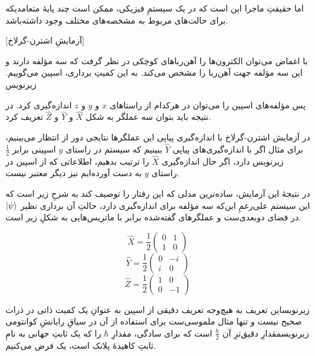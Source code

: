 \documentclass[a4paper,12pt]{article}
\begin{document}
اما حقیقتِ ماجرا این است که در یک سیستمِ فیزیکی، ممکن است چند پایهٔ متعامدیکه برای  حالت‌های مربوط به مشخصه‌های مختلف وجود داشته‌باشد.

[آزمایشِ اشترن-گرلاخ]


با اغماض می‌توان الکترون‌ها را آهن‌رباهای کوچکی در نظر گرفت که سه مؤلفه دارند و این سه مؤلفه جهت آهن‌ربا را مشخص می‌کند. به این کمیتِ برداری، اسپین می‌گوییم.
‌زیرنویس

پس مؤلفه‌های اسپین را می‌توان در هرکدام از راستاهای \(x\) و \(y\) و \(z\) اندازه‌گیری کرد. در نتیجه باید بتوان سه عملگر به شکل 
\(\hat{X}\)
و 
\(\hat{Y}\)
و 
\(\hat{Z}\)
تعریف کرد.

در آزمایش اشترن-گرلاخ با اندازه‌گیری پیاپی این عملگرها نتایجی دور از انتظار می‌بینیم، برای مثال اگر با اندازه‌گیری‌های پیاپی 
\(\hat{Y}\)
ببینیم که سیستم در راستای \(y\) اسپینی برابر 
\(\frac{1}{2}\)
‌زیرنویس
دارد، اگر حال اندازه‌گیری 
\(\hat{X}\)
را ترتیب بدهیم، اطلاعاتی که از اسپین در راستای \(y\) به دست آورده‌ایم نیز دیگر معتبر نیست.

در نتیجهٔ این آزمایش، ساده‌ترین مدلی که این رفتار را توصیف کند به شرحِ زیر است که این سیستم علی‌رغمِ این‌که سه مؤلفه برای اندازه‌گیری دارد، حالتِ آن برداری نظیر 
\(\ket{\psi}\)
در فضای دوبعدی‌ست و عملگرهای گفته‌شده برابر با ماتریس‌هایی به شکلِ زیر است.

\begin{equation} \hat{X} = \frac{1}{2} \begin{pmatrix} 0 & 1 \\ 1 & 0 \end{pmatrix} \end{equation}
\begin{equation} \hat{Y} = \frac{1}{2} \begin{pmatrix} 0 & -i \\ i & 0 \end{pmatrix} \end{equation}
\begin{equation} \hat{Z} = \frac{1}{2} \begin{pmatrix} 1 & 0 \\ 0 & -1 \end{pmatrix} \end{equation}

‌زیرنویس{این تعریف به هیچ‌وجه تعریف دقیقی از اسپین به عنوانِ یک کمیت ذاتی در ذرات صحیح نیست و تنها مثال ملموسی‌ست برای استفاده از آن در سیاقِ رایانشِ کوانتومی}
‌زیرنویس{مقدارِ دقیق‌ترِ آن 
\(\frac{\hbar}{2}\)
است که برای سادگی، مقدارِ 
\(\hbar\)
را که یک ثابتِ جهانی به نامِ ثابتِ کاهیدهٔ پلانک است، یک فرض می‌کنیم.}
\end{document}
